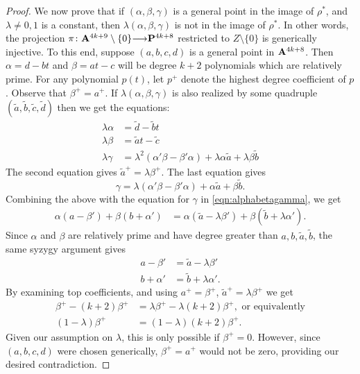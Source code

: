 \documentclass[11pt,reqno]{amsart}
\theoremstyle{plain}
\theoremstyle{definition}
\theoremstyle{remark}
\numberwithin{equation}{section}
\renewcommand{\to}{{\longrightarrow}}
\numberwithin{equation}{section}
\begin{document}
\begin{proof}
  We now prove that if $(\alpha, \beta, \gamma)$ is a general point in the image of $\rho^{*}$, and $\lambda \neq 0,1$ is a constant, then $\lambda(\alpha, \beta, \gamma)$ is not in the image of $\rho^{*}$.
  In other words, the projection $\pi \from \A^{4k+9} \setminus \{0\} \to \P^{4k+8}$ restricted to $Z \setminus \{0\}$ is generically injective.  
  To this end, suppose $(a,b,c,d)$ is a general point in ${\bf A}^{4k+8}$.
  Then  $\alpha = d-bt$ and $\beta = at-c$ will be degree $k+2$ polynomials which are relatively prime.  
  For any polynomial $p(t)$, let $p^{+}$ denote the highest degree coefficient of $p$.
  Observe that $\beta^{+} = a^{+}$.  
  If $\lambda(\alpha, \beta, \gamma)$ is also realized by some quadruple $(\tilde{a}, \tilde{b}, \tilde{c}, \tilde{d})$ then we get the equations: 
	  \begin{align}\label{secondEquation}
	  	\lambda \alpha &= \tilde{d} - \tilde{b}t\\
	  	\lambda \beta &= \tilde{a}t - \tilde{c} \nonumber\\
	  	\lambda \gamma &= \lambda^{2}(\alpha'\beta - \beta' \alpha) + \lambda \alpha \tilde{a} + \lambda \beta \tilde{b}\nonumber
	  \end{align}
	  The second equation gives $\tilde{a}^{+} = \lambda \beta^{+}$.
          The last equation gives
          \[
            \gamma = \lambda(\alpha'\beta - \beta' \alpha) + \alpha \tilde{a} + \beta \tilde{b}.
          \]
          Combining the above with the equation for $\gamma$ in \eqref{eqn:alphabetagamma}, we get 
	  \begin{align*}\label{alphasbetas}
	    	\alpha (a - \beta') + \beta (b + \alpha') &= \alpha(\tilde{a} - \lambda\beta') + \beta(\tilde{b} + \lambda \alpha').
          \end{align*} 
          Since $\alpha$ and $\beta$ are relatively prime and have degree greater than $a,b,\tilde{a},\tilde{b}$, the same syzygy argument gives
          \begin{align*}
            a-\beta' &= \tilde{a} - \lambda \beta'\\
            b+\alpha' &= \tilde{b} + \lambda \alpha'.
          \end{align*} 
	     By examining top coefficients, and using $a^{+} = \beta^{+}$, $\tilde{a}^{+} = \lambda \beta^{+}$ we get
	     \begin{align*}
	     	\beta^{+} - (k+2)\beta^{+} &= \lambda\beta^{+} - \lambda(k+2)\beta^{+}, \text{ or equivalently}\\
               (1-\lambda)\beta^{+} &= (1-\lambda)(k+2)\beta^{+}.
	     \end{align*}
	     Given our assumption on $\lambda$, this is only possible if $\beta^{+} = 0$.  However, since $(a,b,c,d)$ were chosen generically, $\beta^{+} = a^{+}$ would not be zero, providing our desired contradiction.


\end{proof}
\end{document}
